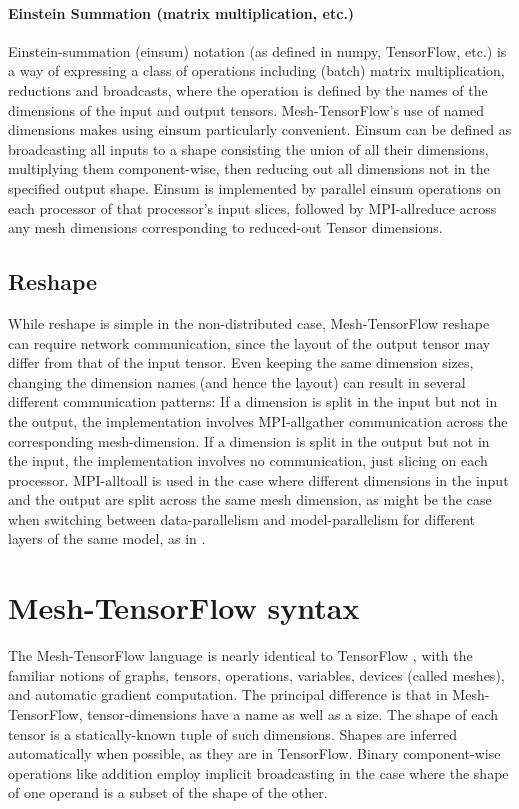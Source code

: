 \documentclass{article}
\begin{document}
\paragraph{Einstein Summation (matrix multiplication, etc.)}  Einstein-summation (einsum) notation (as defined in numpy, TensorFlow, etc.) is a way of expressing a class of operations including (batch) matrix multiplication, reductions and broadcasts, where the operation is defined by the names of the dimensions of the input and output tensors.  Mesh-TensorFlow's use of named dimensions makes using einsum particularly convenient.  Einsum can be defined as broadcasting all inputs to a shape consisting the union of all their dimensions, multiplying them component-wise, then reducing out all dimensions not in the specified output shape.   Einsum is implemented by parallel einsum operations on each processor of that processor's input slices, followed by MPI-allreduce across any mesh dimensions corresponding to reduced-out Tensor dimensions.

\subsection{Reshape}  While reshape is simple in the non-distributed case, Mesh-TensorFlow reshape can require network communication, since the layout of the output tensor may differ from that of the input tensor.  Even keeping the same dimension sizes, changing the dimension names (and hence the layout) can result in several different communication patterns:  If a dimension is split in the input but not in the output, the implementation involves MPI-allgather communication across the corresponding mesh-dimension.  If a dimension is split in the output but not in the input, the implementation involves no communication, just slicing on each processor.  MPI-alltoall is used in the case where different dimensions in the input and the output are split across the same mesh dimension, as might be the case when switching between data-parallelism and model-parallelism for different layers of the same model, as in \cite{Shazeer17}.

\section{Mesh-TensorFlow syntax}
The Mesh-TensorFlow language is nearly identical to TensorFlow \cite{tensorflow2015-whitepaper}, with the familiar notions of graphs, tensors, operations, variables, devices (called meshes), and automatic gradient computation.  The principal difference is that in Mesh-TensorFlow, tensor-dimensions have a name as well as a size.  The shape of each tensor is a statically-known tuple of such dimensions.   Shapes are inferred automatically when possible, as they are in TensorFlow.  Binary component-wise operations like addition employ implicit broadcasting in the case where the shape of one operand is a subset of the shape of the other.
\end{document}
